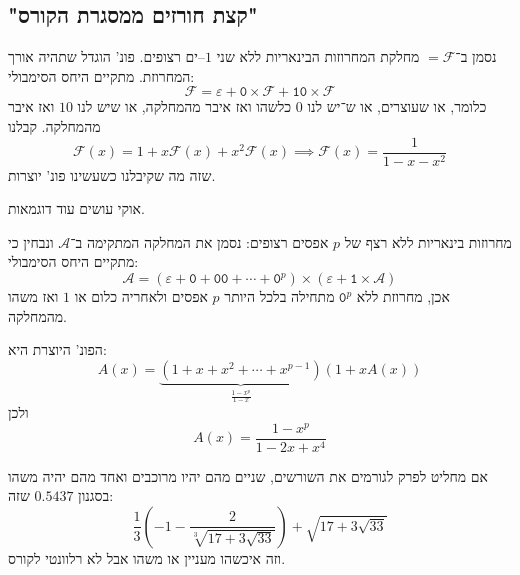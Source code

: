\documentclass[]{article}
\newcommand\ac    {\mathcal{A}}
\newcommand\fc    {\mathcal{F}}
\newcommand\epsi  {\varepsilon}
\newcommand\cl [1]    {\left ( #1 \right )}
\begin{document}
	 
	 \subsection{"קצת חורזים ממסגרת הקורס"}
	 נסמן ב־$=\fc$ מחלקת המחרוזות הבינאריות ללא שני $1$–ים רצופים. פונ' הוגדל שתהיה אורך המחרוזת. מתקיים היחס הסימבולי: 
	 \[ \fc = \epsi + \texttt{0} \times \fc + \texttt{10} \times \fc \]
	 כלומר, או שעוצרים, או ש־יש לנו $0$ כלשהו ואז איבר מהמחלקה, או שיש לנו $10$ ואז איבר מהמחלקה. 
	 קבלנו
	 \[ \fc(x) = 1 + x\fc(x) + x^{2}\fc(x) \implies \fc(x) = \frac{1}{1 - x - x^{2}} \]
	 שזה מה שקיבלנו כשעשינו פונ' יוצרות.
	 
	 אוקי עושים עוד דוגמאות. 
	 
	 מחרוזות בינאריות ללא רצף של $p$ אפסים רצופים: נסמן את המחלקה המתקימה ב־$\ac$ ונבחין כי מתקיים היחס הסימבולי: 
	 \[ \ac = (\epsi + \texttt{0} + \texttt{00} + \cdots + \texttt{0}^{p}) \times (\epsi + \texttt{1} \times \ac) \]
	 אכן, מחרוזת ללא $\texttt{0}^{p}$ מתחילה בלכל היותר $p$ אפסים ולאחריה כלום או $1$ ואז משהו מהמחלקה. 
	 
	 הפונ' היוצרת היא: 
	 \[ A(x) = \underbrace{(1 + x + x^{2} + \cdots + x^{p - 1})}_{\frac{1 - x^p}{1 - x}}(1 + xA(x)) \]
	 ולכן 
	 \[ A(x) = \frac{1 - x^p}{1 - 2x + x^4} \]
	 
	 אם מחליט לפרק לגורמים את השורשים, שניים מהם יהיו מרוכבים ואחד מהם יהיה משהו בסגנון $0.5437$ שזה: 
	 \[ \frac{1}{3}\cl{-1 - \frac{2}{\sqrt[3]{17 + 3\sqrt{33}}}} + \sqrt{17 + 3\sqrt{33}}  \]
	 וזה איכשהו מעניין או משהו אבל לא רלוונטי לקורס. 
	 
\end{document}
